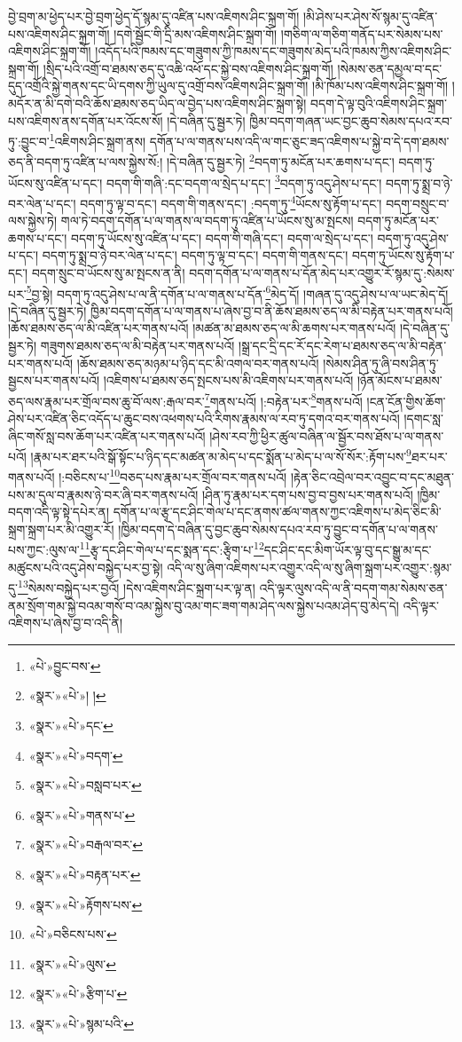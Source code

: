 བྱེ་བྲག་མ་ཕྱེད་པར་བྱེ་བྲག་ཕྱེད་དོ་སྙམ་དུ་འཛིན་པས་འཇིགས་ཤིང་སྐྲག་གོ། །མི་ཤེས་པར་ཤེས་སོ་སྙམ་དུ་འཛིན་པས་འཇིགས་ཤིང་སྐྲག་གོ། །དགེ་སྦྱོང་གི་དྲི་མས་འཇིགས་ཤིང་སྐྲག་གོ། །གཅིག་ལ་གཅིག་གནོད་པར་སེམས་པས་འཇིགས་ཤིང་སྐྲག་གོ། །འདོད་པའི་ཁམས་དང་གཟུགས་ཀྱི་ཁམས་དང་གཟུགས་མེད་པའི་ཁམས་ཀྱིས་འཇིགས་ཤིང་སྐྲག་གོ། །སྲིད་པའི་འགྲོ་བ་ཐམས་ཅད་དུ་འཆི་འཕོ་དང་སྐྱེ་བས་འཇིགས་ཤིང་སྐྲག་གོ། །སེམས་ཅན་དམྱལ་བ་དང་དུད་འགྲོའི་སྐྱེ་གནས་དང་ཡི་དགས་ཀྱི་ཡུལ་དུ་འགྲོ་བས་འཇིགས་ཤིང་སྐྲག་གོ། །མི་ཁོམ་པས་འཇིགས་ཤིང་སྐྲག་གོ། །མདོར་ན་མི་དགེ་བའི་ཆོས་ཐམས་ཅད་ཡིད་ལ་བྱེད་པས་འཇིགས་ཤིང་སྐྲག་སྟེ། བདག་དེ་ལྟ་བུའི་འཇིགས་ཤིང་སྐྲག་པས་འཇིགས་ནས་དགོན་པར་འོངས་སོ། །དེ་བཞིན་དུ་སྦྱར་ཏེ། ཁྱིམ་བདག་གཞན་ཡང་བྱང་ཆུབ་སེམས་དཔའ་རབ་ཏུ་:བྱུང་བ་\footnote{«པེ་»བྱུང་བས་}འཇིགས་ཤིང་སྐྲག་ནས། དགོན་པ་ལ་གནས་པས་འདི་ལ་གང་ཅུང་ཟད་འཇིགས་པ་སྐྱེ་བ་དེ་དག་ཐམས་ཅད་ནི་བདག་ཏུ་འཛིན་པ་ལས་སྐྱེས་སོ:། །དེ་བཞིན་དུ་སྦྱར་ཏེ། \footnote{«སྣར་»«པེ་»། ། }བདག་ཏུ་མངོན་པར་ཆགས་པ་དང་། བདག་ཏུ་ཡོངས་སུ་འཛིན་པ་དང་། བདག་གི་གཞི་:དང་བདག་ལ་སྲེད་པ་དང་། \footnote{«སྣར་»«པེ་»དང་}བདག་ཏུ་འདུ་ཤེས་པ་དང་། བདག་ཏུ་སྨྲ་བ་ཉེ་བར་ལེན་པ་དང་། བདག་ཏུ་ལྟ་བ་དང་། བདག་གི་གནས་དང་། :བདག་ཏུ་\footnote{«སྣར་»«པེ་»བདག་}ཡོངས་སུ་རྟོག་པ་དང་། བདག་བསྲུང་བ་ལས་སྐྱེས་ཏེ། གལ་ཏེ་བདག་དགོན་པ་ལ་གནས་ལ་བདག་ཏུ་འཛིན་པ་ཡོངས་སུ་མ་སྤངས། བདག་ཏུ་མངོན་པར་ཆགས་པ་དང་། བདག་ཏུ་ཡོངས་སུ་འཛིན་པ་དང་། བདག་གི་གཞི་དང་། བདག་ལ་སྲེད་པ་དང་། བདག་ཏུ་འདུ་ཤེས་པ་དང་། བདག་ཏུ་སྨྲ་བ་ཉེ་བར་ལེན་པ་དང་། བདག་ཏུ་ལྟ་བ་དང་། བདག་གི་གནས་དང་། བདག་ཏུ་ཡོངས་སུ་རྟོག་པ་དང་། བདག་སྲུང་བ་ཡོངས་སུ་མ་སྤངས་ན་ནི། བདག་དགོན་པ་ལ་གནས་པ་དོན་མེད་པར་འགྱུར་རོ་སྙམ་དུ་:སེམས་པར་\footnote{«སྣར་»«པེ་»བསླབ་པར་}བྱ་སྟེ། བདག་ཏུ་འདུ་ཤེས་པ་ལ་ནི་དགོན་པ་ལ་གནས་པ་དོན་\footnote{«སྣར་»«པེ་»གནས་པ་}མེད་དོ། །གཞན་དུ་འདུ་ཤེས་པ་ལ་ཡང་མེད་དོ། །དེ་བཞིན་དུ་སྦྱར་ཏེ། ཁྱིམ་བདག་དགོན་པ་ལ་གནས་པ་ཞེས་བྱ་བ་ནི་ཆོས་ཐམས་ཅད་ལ་མི་བརྟེན་པར་གནས་པའོ། །ཆོས་ཐམས་ཅད་ལ་མི་འཛིན་པར་གནས་པའོ། །མཚན་མ་ཐམས་ཅད་ལ་མི་ཆགས་པར་གནས་པའོ། །དེ་བཞིན་དུ་སྦྱར་ཏེ། གཟུགས་ཐམས་ཅད་ལ་མི་བརྟེན་པར་གནས་པའོ། །སྒྲ་དང་དྲི་དང་རོ་དང་རེག་པ་ཐམས་ཅད་ལ་མི་བརྟེན་པར་གནས་པའོ། །ཆོས་ཐམས་ཅད་མཉམ་པ་ཉིད་དང་མི་འགལ་བར་གནས་པའོ། །སེམས་ཤིན་ཏུ་ཞི་བས་ཤིན་ཏུ་སྦྱངས་པར་གནས་པའོ། །འཇིགས་པ་ཐམས་ཅད་སྤངས་པས་མི་འཇིགས་པར་གནས་པའོ། །ཉོན་མོངས་པ་ཐམས་ཅད་ལས་རྣམ་པར་གྲོལ་བས་ཆུ་བོ་ལས་:རྒལ་བར་\footnote{«སྣར་»«པེ་»བརྒལ་བར་}གནས་པའོ། །:བརྟེན་པར་\footnote{«སྣར་»«པེ་»བརྟན་པར་}གནས་པའོ། །ངན་ངོན་གྱིས་ཆོག་ཤེས་པར་འཛིན་ཅིང་འདོད་པ་ཆུང་བས་འཕགས་པའི་རིགས་རྣམས་ལ་རབ་ཏུ་དགའ་བར་གནས་པའོ། །དགང་སླ་ཞིང་གསོ་སླ་བས་ཆོག་པར་འཛིན་པར་གནས་པའོ། །ཤེས་རབ་ཀྱི་ཕྱིར་ཚུལ་བཞིན་ལ་སྦྱོར་བས་ཐོས་པ་ལ་གནས་པའོ། །རྣམ་པར་ཐར་པའི་སྒོ་སྟོང་པ་ཉིད་དང་མཚན་མ་མེད་པ་དང་སྨོན་པ་མེད་པ་ལ་སོ་སོར་:རྟོག་པས་\footnote{«སྣར་»«པེ་»རྟོགས་པས་}ཐར་པར་གནས་པའོ། །:བཅིངས་པ་\footnote{«པེ་»བཅིངས་པས་}བཅད་པས་རྣམ་པར་གྲོལ་བར་གནས་པའོ། །རྟེན་ཅིང་འབྲེལ་བར་འབྱུང་བ་དང་མཐུན་པས་མ་དུལ་བ་རྣམས་ཉེ་བར་ཞི་བར་གནས་པའོ། །ཤིན་ཏུ་རྣམ་པར་དག་པས་བྱ་བ་བྱས་པར་གནས་པའོ། །ཁྱིམ་བདག་འདི་ལྟ་སྟེ་དཔེར་ན། དགོན་པ་ལ་རྩྭ་དང་ཤིང་གེལ་པ་དང་ནགས་ཚལ་གནས་ཀྱང་འཇིགས་པ་མེད་ཅིང་མི་སྐྲག་སྐྲག་པར་མི་འགྱུར་རོ། །ཁྱིམ་བདག་དེ་བཞིན་དུ་བྱང་ཆུབ་སེམས་དཔའ་རབ་ཏུ་བྱུང་བ་དགོན་པ་ལ་གནས་པས་ཀྱང་:ལུས་ལ་\footnote{«སྣར་»«པེ་»ལུས་}རྩྭ་དང་ཤིང་གེལ་པ་དང་སྨན་དང་:རྩྭིག་པ་\footnote{«སྣར་»«པེ་»རྩིག་པ་}དང་ཤིང་དང་མིག་ཡོར་ལྟ་བུ་དང་སྒྱུ་མ་དང་མཚུངས་པའི་འདུ་ཤེས་བསྐྱེད་པར་བྱ་སྟེ། འདི་ལ་སུ་ཞིག་འཇིགས་པར་འགྱུར་འདི་ལ་སུ་ཞིག་སྐྲག་པར་འགྱུར་:སྙམ་དུ་\footnote{«སྣར་»«པེ་»སྙམ་པའི་}སེམས་བསྐྱེད་པར་བྱའོ། །དེས་འཇིགས་ཤིང་སྐྲག་པར་ལྟ་ན། འདི་ལྟར་ལུས་འདི་ལ་ནི་བདག་གམ་སེམས་ཅན་ནམ་སྲོག་གམ་སྐྱེ་བའམ་གསོ་བ་འམ་སྐྱེས་བུ་འམ་གང་ཟག་གམ་ཤེད་ལས་སྐྱེས་པའམ་ཤེད་བུ་མེད་དེ། འདི་ལྟར་འཇིགས་པ་ཞེས་བྱ་བ་འདི་ནི། 